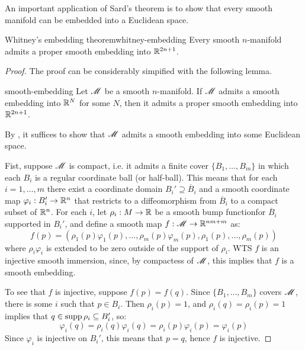 An important application of Sard's theorem is to show that every smooth manifold can be embedded into a Euclidean space.

\begin{theorem}{Whitney's embedding theorem}{whitney-embedding}
  Every smooth $ n $-manifold admits a proper smooth embedding into $ \mathbb{R}^{2n+1} $.
\end{theorem}

\begin{proofbox}
  \begin{proof}
    The proof can be considerably simpified with the following lemma.

    \begin{lemma}{}{smooth-embedding}
      Let $ \mathscr{M} $ be a smooth $ n $-manifold. If $ \mathscr{M} $ admits a smooth embedding into $ \mathbb{R}^N $ for some $ N $, then it admits a proper smooth embedding into $ \mathbb{R}^{2n+1} $.
    \end{lemma}

    By , it suffices to show that $ \mathscr{M} $ admits a smooth embedding into some Euclidean space.

    Fist, suppose $ \mathscr{M} $ is compact, i.e. it admits a finite cover $ \{B_1 , \dots, B_m\} $ in which each $ B_i $ is a regular coordinate ball (or half-ball). This means that for each $ i = 1 , \dots , m $ there exist a coordinate domain $ B_i' \supseteq \overline{B}_i $ and a smooth coordinate map $ \varphi_i : B_i' \rightarrow \mathbb{R}^n $ that restricts to a diffeomorphism from $ \overline{B}_i $ to a compact subset of $ \mathbb{R}^n $. For each $ i $, let $ \rho_i : M \rightarrow \mathbb{R} $ be a smooth bump function\footnotemark for $ \overline{B}_i $ supported in $ B_i' $, and define a smooth map $ f : \mathscr{M} \rightarrow \mathbb{R}^{nm + m} $ as:
    \begin{equation*}
      f(p) = (\rho_1(p) \varphi_1(p) , \dots , \rho_m(p) \varphi_m(p) , \rho_1(p) , \dots , \rho_m(p))
    \end{equation*}
    where $ \rho_i \varphi_i $ is extended to be zero outside of the support of $ \rho_i $. WTS $ f $ is an injective smooth immersion, since, by compactess of $ \mathscr{M} $, this implies that $ f $ is a smooth embedding.

    To see that $ f $ is injective, suppose $ f(p) = f(q) $. Since $ \{B_1 , \dots , B_m\} $ covers $ \mathscr{M} $, there is some $ i $ such that $ p \in B_i $. Then $ \rho_i(p) = 1 $, and $ \rho_i(q) = \rho_i(p) = 1 $ implies that $ q \in \operatorname{supp} \rho_i \subseteq B_i' $, so:
    \begin{equation*}
      \varphi_i(q) = \rho_i(q) \varphi_i(q) = \rho_i(p) \varphi_i(p) = \varphi_i(p)
    \end{equation*}
    Since $ \varphi_i $ is injective on $ B_i' $, this means that $ p = q $, hence $ f $ is injective.


\end{proof}
\end{proofbox}
